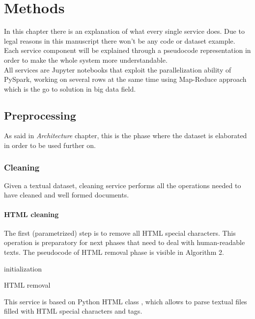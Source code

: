 \documentclass[\main/main.tex]{subfiles}
\begin{document}
\chapter{Methods}
\label{methods}
In this chapter there is an explanation of what every single service does. Due to legal reasons in this manuscript there won't be any code or dataset example. Each service component will be explained through a pseudocode representation in order to make the whole system more understandable.\\
All services are Jupyter notebooks that exploit the parallelization ability of PySpark, working on several rows at the same time using Map-Reduce approach which is the go to solution in big data field.
\section{Preprocessing}
As said in \emph{Architecture} chapter, this is the phase where the dataset is elaborated in order to be used further on. 
\subsection{Cleaning}
Given a textual dataset, cleaning service performs all the operations needed to have cleaned and well formed documents.
\subsubsection{HTML cleaning}
The first (parametrized) step is to remove all HTML special characters. This operation is preparatory for next phases that need to deal with human-readable texts. The pseudocode of HTML removal phase is visible in Algorithm 2.
\begin{center}
    \begin{algorithm}[H]
     initialization
     \caption{HTML removal}
    \end{algorithm}
\end{center}
This service is based on Python HTML class \cite{html_parser}, which allows to parse textual files filled with HTML special characters and tags.
\end{document}
